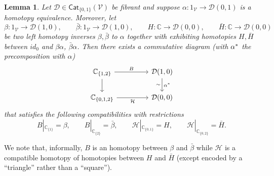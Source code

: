 \documentclass[a4paper,10pt
 ,final
]{article}%
\numberwithin{equation}{section}
\numberwithin{figure}{section}
\newtheorem{lemma}[equation]{Lemma}%
\theoremstyle{definition} %
\newcommand{\V}{\ensuremath{\mathcal V}}
\newcommand{\1}{\ensuremath{\mathbbm 1}}%
\begin{document}
\begin{lemma}\label{HOMTPOFHOMTP LEM}
	Let $\mathcal{D} \in \mathsf{Cat}_{\{0,1\}}(\V)$
	be fibrant and suppose 
	$\alpha \colon 1_{\V} \to \mathcal{D}(0,1)$
	is a homotopy equivalence. 
	Moreover, let 
	\[\beta \colon 1_{\V} \to \mathcal{D}(1,0), \qquad
	\bar{\beta} \colon 1_{\V} \to \mathcal{D}(1,0),\qquad
	H \colon \mathbb{C} \to \mathcal{D}(0,0), \qquad
	\bar{H} \colon \mathbb{C} \to \mathcal{D}(0,0)
	\]
	be two left homotopy inverses $\beta,\bar{\beta}$ to $\alpha$
	together with exhibiting homotopies 
	$H,\bar{H}$
	between $id_0$ and $\beta \alpha$, $\bar{\beta}\alpha$.
	Then there exists a commutative diagram (with $\alpha^{\**}$ the precomposition with $\alpha$)
	\begin{equation}
	\begin{tikzcd}[column sep = 45pt]
	\mathbb{C}_{\{1,2\}}
	\ar{d}
	\arrow{r}{B}
	&
	\mathcal{D}(1,0)
	\arrow{d}{\alpha^{\**}}[swap]{\sim}
	\\
	\mathbb{C}_{\{0,1,2\}}
	\arrow{r}[swap]{\mathcal{H}}
	&
	\mathcal{D}(0,0)
	\end{tikzcd}
	\end{equation}
	that satisfies the following compatibilities with restrictions
	\[
	B|_{\mathbb{C}_{\{1\}}} = \beta, \qquad
	B|_{\mathbb{C}_{\{2\}}} = \bar{\beta}, \qquad
	\mathcal{H}|_{\mathbb{C}_{\{0,1\}}} = H, \qquad
	\mathcal{H}|_{\mathbb{C}_{\{0,2\}}} = \bar{H}.
	\]
\end{lemma}

We note that, informally, $B$ is an homotopy between $\beta$ and $\bar{\beta}$
while $\mathcal{H}$
is a compatible homotopy of homotopies 
between $H$ and $\bar{H}$
(except encoded by a ``triangle'' rather than a ``square'').
\end{document}
